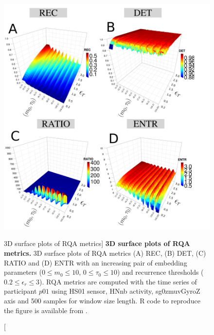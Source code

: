 \begin{figure}[h!]
\centering
\includegraphics[width=1.0\textwidth]{fig_5_15}
    \caption
	[3D surface plots of RQA metrics]{
	{\bf 3D surface plots of RQA metrics.}
	3D surface plots of RQA metrics (A) REC, (B) DET, (C) RATIO and 
	(D) ENTR with an increasing pair of embedding parameters 
	($0 \le m_0 \le 10$, $0 \le \tau_0 \le 10$) 
	and recurrence thresholds ($ 0.2 \le \epsilon_r \le 3 $).
	RQA metrics are computed with the time series of participant $p01$ using 
	HS01 sensor, HNnb activity, sg0zmuvGyroZ axis and 500 samples 
	for window size length.
        R code to reproduce the figure is available from \cite{xochicale2018}.
	}
\label{fig:topo_rqas_w500}
\end{figure}

\newpage
